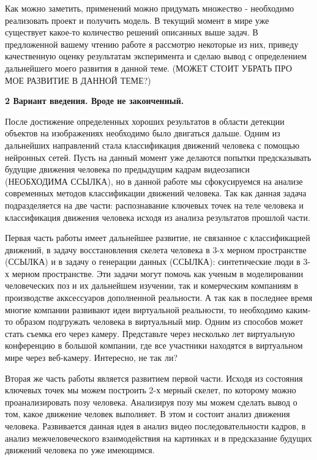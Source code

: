 Как можно заметить, применений можно придумать множество - необходимо реализовать проект и получить модель. В текущий момент в мире уже существует какое-то количество решений описанных выше задач. В предложенной вашему чтению работе я рассмотрю некоторые из них, приведу качественную оценку результатам эксперимента и сделаю вывод с определением дальнейшего моего развития в данной теме. (МОЖЕТ СТОИТ УБРАТЬ ПРО МОЕ РАЗВИТИЕ В ДАННОЙ ТЕМЕ?)



\hfill \break
\textbf{\Large 2 Вариант введения. Вроде не законченный.}

После достижение определенных хороших результатов в области детекции объектов на изображениях необходимо было двигаться дальше. Одним из дальнейших направлений стала классификация движений человека с помощью нейронных сетей. Пусть на данный момент уже делаются попытки предсказывать будущие движения человека по предыдущим кадрам видеозаписи (НЕОБХОДИМА ССЫЛКА), но в данной работе мы сфокусируемся на анализе современных методов классификации движений человека. Так как данная задача подразделяется на две части: распознавание ключевых точек на теле человека и классификация движения человека исходя из анализа результатов прошлой части.

Первая часть работы имеет дальнейшее развитие, не связанное с классификацией движений,  в задачу восстановления скелета человека в 3-х мерном пространстве (ССЫЛКА) и в задачу о генерации данных (ССЫЛКА): синтетические люди в 3-х мерном пространстве. Эти задачи могут помочь как ученым в моделировании человеческих поз и их дальнейшем изучении, так и комерческим компаниям в производстве акксессуаров дополненной реальности. А так как в последнее время многие компании развивают идеи виртуальной реальности, то необходимо каким-то образом подгружать человека в виртуальный мир. Одним из способов может стать съемка его через камеру. Представьте через несколько лет виртуальную конференцию в большой компании, где все участники находятся в виртуальном мире через веб-камеру. Интересно, не так ли?

Вторая же часть работы является развитием первой части. Исходя из состояния ключевых точек мы можем построить 2-х мерный скелет, по которому можно проанализировать позу человека. Анализируя позу мы можем сделать вывод о том, какое движение человек выполняет. В этом и состоит анализ движения человека. Развивается данная идея в анализ видео последовательности кадров, в анализ межчеловеческого взаимодействия на картинках и в предсказание будущих движений человека по уже имеющимся.  

